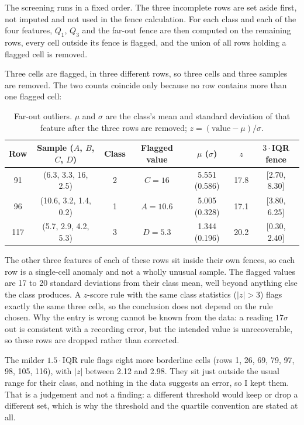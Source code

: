 The screening runs in a fixed order. The three incomplete rows are set aside first, not imputed and not used in the fence
calculation. For each class and each of the four features, $Q_1$, $Q_3$ and the far-out fence are then computed on the
remaining rows, every cell outside its fence is flagged, and the union of all rows holding a flagged cell is removed.

Three cells are flagged, in three different rows, so three cells and three samples are removed. The two counts coincide only
because no row contains more than one flagged cell:

\begin{table}[htbp]
\centering
\footnotesize
\caption{Far-out outliers. $\mu$ and $\sigma$ are the class's mean and standard deviation of that feature after the three rows are
removed; $z = (\text{value} - \mu)/\sigma$.}
\begin{tabular}{@{}ccccccc@{}}
\toprule
Row & Sample ($A$, $B$, $C$, $D$) & Class & Flagged value & $\mu$ ($\sigma$) & $z$ & $3\cdot$IQR fence \\
\midrule
91 & (6.3, 3.3, 16, 2.5) & 2 & $C = 16$ & 5.551 (0.586) & 17.8 & [2.70, 8.30] \\
96 & (10.6, 3.2, 1.4, 0.2) & 1 & $A = 10.6$ & 5.005 (0.328) & 17.1 & [3.80, 6.25] \\
117 & (5.7, 2.9, 4.2, 5.3) & 3 & $D = 5.3$ & 1.344 (0.196) & 20.2 & [0.30, 2.40] \\
\bottomrule
\end{tabular}
\end{table}

The other three features of each of these rows sit inside their own fences, so each row is a single-cell anomaly and not a
wholly unusual sample. The flagged values are 17 to 20 standard deviations from their class mean, well beyond anything else the
class produces. A $z$-score rule with the same class statistics ($|z| > 3$) flags exactly the same three cells, so the
conclusion does not depend on the rule chosen. Why the entry is wrong cannot be known from the data: a reading $17\sigma$ out is
consistent with a recording error, but the intended value is unrecoverable, so these rows are dropped rather than corrected.

The milder $1.5\cdot$IQR rule flags eight more borderline cells (rows 1, 26, 69, 79, 97, 98, 105, 116), with $|z|$ between 2.12
and 2.98. They sit just outside the usual range for their class, and nothing in the data suggests an error, so I kept them. That
is a judgement and not a finding: a different threshold would keep or drop a different set, which is why the threshold and the
quartile convention are stated at all.

